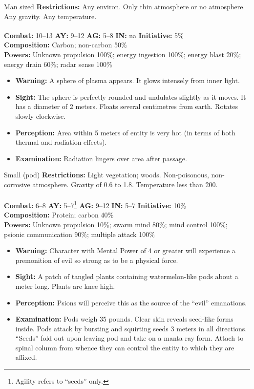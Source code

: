 \hrulefill

\begin{creature}{Man sized}
\textbf{Restrictions:} Any environ. Only thin atmosphere or no atmosphere. Any gravity. Any temperature. \\\\
\textbf{Combat:} 10--13 \textbf{AY:} 9--12 \textbf{AG:} 5--8 \textbf{IN:} na \textbf{Initiative:} 5\% \\
\textbf{Composition:} Carbon; non-carbon 50\% \\
\textbf{Powers:} Unknown propulsion 100\%; energy ingestion 100\%; energy blast 20\%; energy drain 60\%; radar sense 100\% 
\begin{itemize}
\item \textbf{Warning:} A sphere of plasma appears. It glows intensely from inner light. 
\item \textbf{Sight:} The sphere is perfectly rounded and undulates slightly as it moves. It has a diameter of 2 meters. Floats several centimetres 
from earth. Rotates slowly clockwise. 
\item\textbf{Perception:} Area within 5 meters of entity is very hot (in terms of both thermal and radiation effects). 
\item \textbf{Examination:} Radiation lingers over area after passage. 
\end{itemize}
\end{creature}

\hrulefill

\begin{creature}{Small (pod)}
\textbf{Restrictions:} Light vegetation; woods. Non-poisonous, non-corrosive atmosphere. Gravity of 0.6 to 1.8. Temperature less than 200\textdegree. \\\\
\textbf{Combat:} 6--8 \textbf{AY:} 5--7\footnote{Agility refers to ``seeds'' only.} \textbf{AG:} 9--12 \textbf{IN:} 5--7 \textbf{Initiative:} 10\% \\
\textbf{Composition:} Protein; carbon 40\% \\
\textbf{Powers:} Unknown propulsion 10\%; swarm mind 80\%; mind control 100\%; psionic communication 90\%; multiple attack 100\% 
\begin{itemize}
\item \textbf{Warning:} Character with Mental Power of 4 or greater will experience a premonition of evil so strong as to be a physical force. 
\item \textbf{Sight:} A patch of tangled plants containing watermelon-like pods about a meter long. Plants are knee high. 
\item \textbf{Perception:} Psions will perceive this as the source of the ``evil'' emanations. 
\item \textbf{Examination:} Pods weigh 35 pounds. Clear skin reveals seed-like forms inside. Pods attack by bursting and squirting seeds 3 meters 
in all directions. ``Seeds'' fold out upon leaving pod and take on a manta ray form. Attach to spinal column from whence they can control 
the entity to which they are affixed. 
\end{itemize}
\end{creature}

